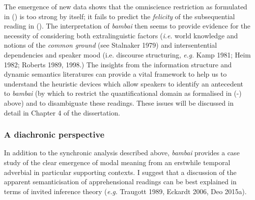 \documentclass[12pt]{article}
\newcommand{\hk}[1]
 {\marginpar{\color{purple}\raggedleft\raggedright\hspace{0pt}\linespread{0.8}\footnotesize{#1}}}
\renewcommand{\hk}[1]{}
\begin{document}
		\hk{\textbf{Gen comment 4}
		
		Rewrite and reframe this last paragraph. It could be its own section, roughly here (the other part I think should move up), introducing a problematic example and sketching a solution. If you spend an entire section spelling out a theory, you should not end that section by saying that what you did up until now doesn't work. It's fine to say that additional data will lead to a refinement of the theory or to the adoption of a dynamic framework to work within, to cash out insights that a static approach doesn't give you (and you will probably need to explain what static/dynamic mean here) -- but it should be clear that it's an addition/refinement of what you've done, not replacing it (or, again, why did you make us read all this wrong stuff?) 
		
		In other word: we should get the strongest and clearest arguments and a good, working, final result. We don't necessarily need to get the whole story of how you discovered this solution and all the steps that didn't work along the way. 
		}
The emergence of new data shows that the omniscience restriction as formulated in (\lastx) is too strong by itself; it fails to predict the \textit{felicity} of the subsequential reading in (). The interpretation of \textit{bambai} then seems to provide evidence for the necessity of considering both extralinguistic factors (\textit{i.e.} world knowledge and notions of the \textit{common ground} (see Stalnaker 1979) and intersentential dependencies and speaker mood (i.e. discourse structuring, \textit{e.g.} Kamp 1981; Heim 1982; Roberts 1989, 1998.) The insights from the information structure and dynamic semantics literatures can provide a vital framework to help us to understand the heuristic devices which allow speakers to identify an antecedent to \textit{bambai} (by which to restrict the quantificational domain as formalised in (-) above) and to disambiguate these readings. These issues will be discussed in detail in Chapter 4 of the dissertation.

\subsubsection{A diachronic perspective}
In addition to the synchronic analysis described above, \textit{bambai} provides a case study of the clear emergence of modal meaning from an erstwhile temporal adverbial in particular supporting contexts. I suggest that a discussion of the apparent semanticisation of apprehensional readings can be best explained in terms of invited inference theory (\textit{e.g.} Traugott 1989, Eckardt 2006, Deo 2015a). 
\end{document}
